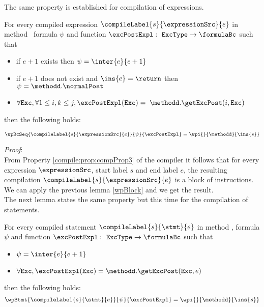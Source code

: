 The same property is established for compilation of expressions. 
\begin{relWpExpr}\label{relWpExpr}
     For every compiled expression $\compileLabel{s}{\expressionSrc}{e}$  in  method \methodd  \,  formula $\psi$ and function $\excPostExpl : \mbox{ \rm \texttt{ExcType}}  \rightarrow \formulaBc $ such that 

      \begin{itemize}
            \item if $e+1$ exists  then $\psi = \inter{e}{e+1}$
	    \item if $e+1$ does not exist and $\ins{e} = \return$ then $\psi = \methodd. \normalPost$
	    
	    \item $\forall \mbox{\rm\texttt{Exc}} ,  \forall 1 \le i,k \le j,  \excPostExpl( \mbox{\rm\texttt{Exc}} ) =$ 
                  $ \methodd.\getExcPost(i, \mbox{\rm\texttt{Exc}}) $ 
            

      \end{itemize} then the following holds:

     $$   \wpBcSeq{\compileLabel{s}{\expressionSrc}{e}   }{\psi }{\excPostExpl} = \wpi{}{\methodd}{\ins{s}}$$        

\end{relWpExpr}

\textit{Proof}: \\
From Property \ref{compile:prop:compProp3} of the compiler it follows that for every expression
 $\expressionSrc$, start label $s$  and  end label $e$,
  the resulting compilation   $\compileLabel{s}{\expressionSrc}{e}$ is a block of instructions. We can apply 
 the previous lemma  \ref{wpBlock} and we get the result.
\Qed \\

The next lemma states the same property but this time for the compilation of statements.
\begin{relWpStmt}\label{relWpStmt}
     For every compiled statement $\compileLabel{s}{\stmt}{e}$  in  method \methodd, formula $\psi$ and 
    function $\excPostExpl : \mbox{ \rm \texttt{ExcType}}  \rightarrow \formulaBc $ such that 

      \begin{itemize}
            \item $\psi = \inter{e}{e+1}$
	    \item $\forall \mbox{\rm\texttt{Exc}} ,  \excPostExpl( \mbox{\rm\texttt{Exc}} ) = \methodd.\getExcPost(\mbox{\rm\texttt{Exc}}, e ) $ 
      \end{itemize} then the following holds: 
     $$   \wpStmt{\compileLabel{s}{\stmt}{e} }{\psi }{\excPostExpl} = \wpi{}{\methodd}{\ins{s}}$$   
\end{relWpStmt}

